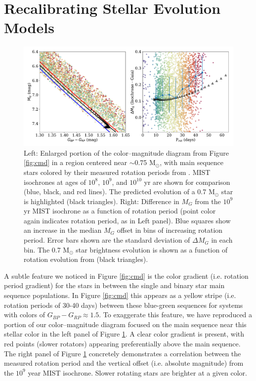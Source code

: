 \documentclass[preprint2]{aastex62}
\begin{document}
\section{Recalibrating Stellar Evolution Models}


\begin{figure}
\centering
\includegraphics[width=6in]{../figures/cmd_zoom}
\caption{
Left: Enlarged portion of the color--magnitude diagram from Figure \ref{fig:cmd} in a region centered near $\sim$0.75 M$_\odot$, with main sequence stars colored by their measured rotation periods from \citet{mcquillan2014}.
MIST isochrones at ages of $10^8$, $10^9$, and $10^{10}$ yr are shown for comparison (blue, black, and red lines). The predicted evolution of a 0.7 M$_\odot$ star is highlighted (black triangles). 
Right: Difference in $M_G$ from the $10^9$ yr MIST isochrone as a function of rotation period (point color again indicates rotation period, as in Left panel). Blue squares show an increase in the median $M_G$ offset in bins of increasing rotation period. Error bars shown are the standard deviation of $\Delta M_G$ in each bin. The 0.7 M$_\odot$ star brightness evolution is shown as a function of rotation evolution from \citet{meibom2009} (black triangles).
}
\label{fig:cmd_zoom}
\end{figure}

A subtle feature we noticed in Figure \ref{fig:cmd} is the color gradient (i.e. rotation period gradient) for the stars in between the single and binary star main sequence populations. In Figure \ref{fig:cmd} this appears as a yellow stripe (i.e. rotation periods of 30-40 days) between these blue-green sequences for systems with colors of $G_{BP} - G_{RP} \approx 1.5$. To exaggerate this feature, we have reproduced a portion of our color--magnitude diagram focused on the main sequence near this stellar color in the left panel of Figure \ref{fig:cmd_zoom}. A clear color gradient is present, with red points (slower rotators) appearing preferentially above the main sequence.
The right panel of Figure \ref{fig:cmd_zoom} concretely demonstrates a correlation between the measured rotation period and the vertical offset (i.e. absolute magnitude) from the $10^9$ year MIST isochrone. Slower rotating stars are brighter at a given color.
\end{document}
